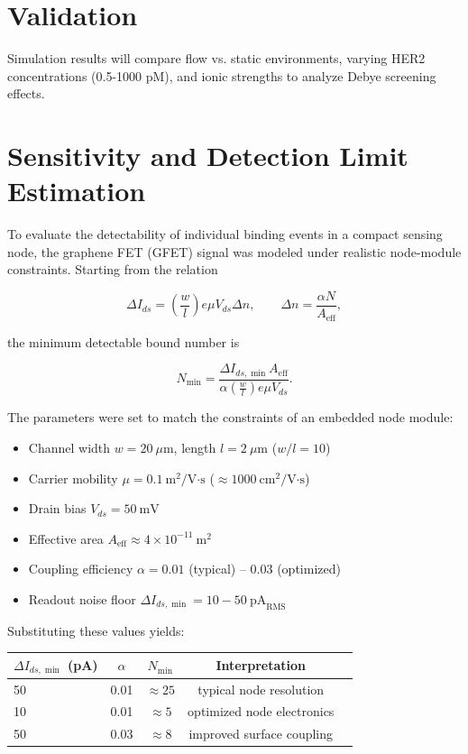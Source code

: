 \documentclass[12pt,a4paper]{report}
\begin{document}
\section{Validation}
Simulation results will compare flow vs. static environments, varying HER2 concentrations (0.5-1000 pM), and ionic strengths to analyze Debye screening effects.

\section{Sensitivity and Detection Limit Estimation}

To evaluate the detectability of individual binding events in a compact sensing node,
the graphene FET (GFET) signal was modeled under realistic node-module constraints.
Starting from the relation

\begin{equation}
\Delta I_{ds} = 
\left( \frac{w}{l} \right) e \mu V_{ds} \Delta n , \qquad
\Delta n = \frac{\alpha N}{A_{\text{eff}}},
\end{equation}

the minimum detectable bound number is

\begin{equation}
N_{\min} =
\frac{\Delta I_{ds,\min} A_{\text{eff}}}
     {\alpha \left(\tfrac{w}{l}\right) e \mu V_{ds}} .
\end{equation}

\noindent
The parameters were set to match the constraints of an embedded node module:

\begin{itemize}
    \item Channel width \(w = 20~\mu\text{m}\), length \(l = 2~\mu\text{m}\) (\(w/l = 10\))
    \item Carrier mobility \(\mu = 0.1~\text{m}^2/\text{V·s}\) (\(\approx 1000~\text{cm}^2/\text{V·s}\))
    \item Drain bias \(V_{ds} = 50~\text{mV}\)
    \item Effective area \(A_{\text{eff}} \approx 4\times10^{-11}~\text{m}^2\)
    \item Coupling efficiency \(\alpha = 0.01\) (typical) – \(0.03\) (optimized)
    \item Readout noise floor \(\Delta I_{ds,\min} = 10{-}50~\text{pA}_{\text{RMS}}\)
\end{itemize}

\noindent
Substituting these values yields:

\begin{center}
\begin{tabular}{lcccc}
\toprule
$\Delta I_{ds,\min}$ (pA) & $\alpha$ & $N_{\min}$ & Interpretation \\ \midrule
50 & 0.01 & $\approx 25$ & typical node resolution \\
10 & 0.01 & $\approx 5$ & optimized node electronics \\
50 & 0.03 & $\approx 8$ & improved surface coupling \\
\bottomrule
\end{tabular}
\end{center}
\end{document}
